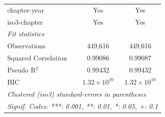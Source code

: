 \begin{tabular}{lcc}
   chapter-year                          & Yes                   & Yes\\  
   iso3-chapter                          & Yes                   & Yes\\  
   \midrule
   \emph{Fit statistics}\\
   Observations                          & 449,616               & 449,616\\  
   Squared Correlation                   & 0.99086               & 0.99087\\  
   Pseudo R$^2$                          & 0.99432               & 0.99432\\  
   BIC                                   & $1.32\times 10^{10}$  & $1.32\times 10^{10}$\\   
   \midrule \midrule
   \multicolumn{3}{l}{\emph{Clustered (iso3) standard-errors in parentheses}}\\
   \multicolumn{3}{l}{\emph{Signif. Codes: ***: 0.001, **: 0.01, *: 0.05, +: 0.1}}\\
\end{tabular}
\par\endgroup


